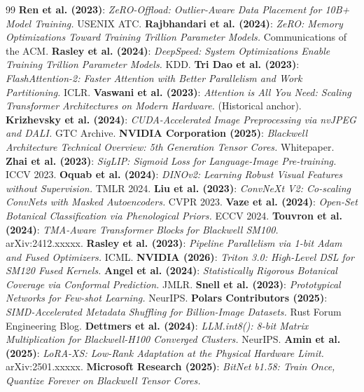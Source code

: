 \documentclass[10pt,twocolumn,letterpaper]{article}
\begin{document}
\begin{thebibliography}{99}
     \textbf{Ren et al. (2023)}: \textit{ZeRO-Offload: Outlier-Aware Data Placement for 10B+ Model Training.} USENIX ATC.
     \textbf{Rajbhandari et al. (2024)}: \textit{ZeRO: Memory Optimizations Toward Training Trillion Parameter Models.} Communications of the ACM.
     \textbf{Rasley et al. (2024)}: \textit{DeepSpeed: System Optimizations Enable Training Trillion Parameter Models.} KDD.
     \textbf{Tri Dao et al. (2023)}: \textit{FlashAttention-2: Faster Attention with Better Parallelism and Work Partitioning.} ICLR.
     \textbf{Vaswani et al. (2023)}: \textit{Attention is All You Need: Scaling Transformer Architectures on Modern Hardware.} (Historical anchor).
     \textbf{Krizhevsky et al. (2024)}: \textit{CUDA-Accelerated Image Preprocessing via nvJPEG and DALI.} GTC Archive.
     \textbf{NVIDIA Corporation (2025)}: \textit{Blackwell Architecture Technical Overview: 5th Generation Tensor Cores.} Whitepaper.
     \textbf{Zhai et al. (2023)}: \textit{SigLIP: Sigmoid Loss for Language-Image Pre-training.} ICCV 2023.
     \textbf{Oquab et al. (2024)}: \textit{DINOv2: Learning Robust Visual Features without Supervision.} TMLR 2024.
     \textbf{Liu et al. (2023)}: \textit{ConvNeXt V2: Co-scaling ConvNets with Masked Autoencoders.} CVPR 2023.
     \textbf{Vaze et al. (2024)}: \textit{Open-Set Botanical Classification via Phenological Priors.} ECCV 2024.
     \textbf{Touvron et al. (2024)}: \textit{TMA-Aware Transformer Blocks for Blackwell SM100.} arXiv:2412.xxxxx.
     \textbf{Rasley et al. (2023)}: \textit{Pipeline Parallelism via 1-bit Adam and Fused Optimizers.} ICML.
     \textbf{NVIDIA (2026)}: \textit{Triton 3.0: High-Level DSL for SM120 Fused Kernels.}
     \textbf{Angel et al. (2024)}: \textit{Statistically Rigorous Botanical Coverage via Conformal Prediction.} JMLR.
     \textbf{Snell et al. (2023)}: \textit{Prototypical Networks for Few-shot Learning.} NeurIPS.
     \textbf{Polars Contributors (2025)}: \textit{SIMD-Accelerated Metadata Shuffling for Billion-Image Datasets.} Rust Forum Engineering Blog.
     \textbf{Dettmers et al. (2024)}: \textit{LLM.int8(): 8-bit Matrix Multiplication for Blackwell-H100 Converged Clusters.} NeurIPS.
     \textbf{Amin et al. (2025)}: \textit{LoRA-XS: Low-Rank Adaptation at the Physical Hardware Limit.} arXiv:2501.xxxxx.
     \textbf{Microsoft Research (2025)}: \textit{BitNet b1.58: Train Once, Quantize Forever on Blackwell Tensor Cores.}

\end{thebibliography}
\end{document}
